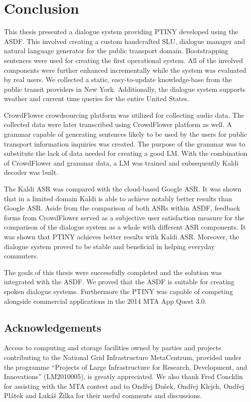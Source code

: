 \chapter*{Conclusion}

This thesis presented a dialogue system providing \acf{PTINY} developed using the \acf{ASDF}.
This involved creating a custom handcrafted \acf{SLU}, dialogue manager and natural language generator for the public transport domain.
Bootstrapping sentences were used for creating the first operational system.
All of the involved components were further enhanced incrementally while the system was evaluated by real users.
We collected a static, easy-to-update knowledge-base from the public transit providers in New York.
Additionally, the dialogue system supports weather and current time queries for the entire United States.

CrowdFlower crowdsourcing platform was utilized for collecting audio data.
The collected data were later transcribed using CrowdFlower platform as well.
A grammar capable of generating sentences likely to be used by the users for public transport information inquiries was created.
The purpose of the grammar was to substitute the lack of data needed for creating a good \acf{LM}.
With the combination of CrowdFlower and grammar data, a \ac{LM} was trained and subsequently Kaldi decoder was built.

The Kaldi \ac{ASR} was compared with the cloud-based Google \ac{ASR}.
It was shown that in a limited domain Kaldi is able to achieve notably better results than Google \ac{ASR}.
Aside from the comparison of both \acp{ASR} within \ac{ASDF}, feedback forms from CrowdFlower served as a subjective user satisfaction measure for the comparison of the dialogue system as a whole with different \ac{ASR} components.
It was shown that \ac{PTINY} achieves better results with Kaldi \ac{ASR}.
Moreover, the dialogue system proved to be stable and beneficial in helping everyday commuters.

The goals of this thesis were successfully completed and the solution was integrated with the \ac{ASDF}.
We proved that the \ac{ASDF} is suitable for creating spoken dialogue systems.
Furthermore the \ac{PTINY} was capable of competing alongside commercial applications in the 2014 \ac{MTA} App Quest 3.0.


\section{Acknowledgements}

Access to computing and storage facilities owned by parties and projects contributing to the National Grid Infrastructure MetaCentrum, provided under the programme ``Projects of Large Infrastructure for Research, Development, and Innovations'' (LM2010005), is greatly appreciated. We also thank Fred Concklin for assisting with the \ac{MTA} contest and to Ondřej Dušek, Ondřej Klejch, Ondřej Plátek and Lukáš Žilka for their useful comments and discussions.

